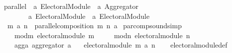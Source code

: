 \begin{isabellebody}
\ parallel\ {\isacharcolon}{\kern0pt}{\isacharcolon}{\kern0pt}\ {\isachardoublequoteopen}{\isacharprime}{\kern0pt}a\ Electoral{\isacharunderscore}{\kern0pt}Module\ {\isasymRightarrow}\ {\isacharprime}{\kern0pt}a\ Aggregator\ {\isasymRightarrow}\isanewline
\ \ \ \ \ \ \ \ {\isacharprime}{\kern0pt}a\ Electoral{\isacharunderscore}{\kern0pt}Module\ {\isasymRightarrow}\ {\isacharprime}{\kern0pt}a\ Electoral{\isacharunderscore}{\kern0pt}Module{\isachardoublequoteclose}\isanewline
\ \ \ \ \ \ {\isacharparenleft}{\kern0pt}{\isachardoublequoteopen}{\isacharunderscore}{\kern0pt}\ {\isasymparallel}\isactrlsub {\isacharunderscore}{\kern0pt}\ {\isacharunderscore}{\kern0pt}{\isachardoublequoteclose}\ {\isacharbrackleft}{\kern0pt}{}{}{\isacharcomma}{\kern0pt}\ {}{}{}{}{\isacharcomma}{\kern0pt}\ {}{}{\isacharbrackright}{\kern0pt}\ {}{}{\isacharparenright}{\kern0pt}\ \isanewline
\ \ {\isachardoublequoteopen}m\ {\isasymparallel}\isactrlsub a\ n\ {\isacharequal}{\kern0pt}{\isacharequal}{\kern0pt}\ parallel{\isacharunderscore}{\kern0pt}composition\ m\ n\ a{\isachardoublequoteclose}%
\isadelimdocument
%
\endisadelimdocument
%
\isatagdocument
%
\isamarkuptrue%
%
\endisatagdocument
{\isafolddocument}%
%
\isadelimdocument
%
\endisadelimdocument
{}\isamarkupfalse%
\ par{\isacharunderscore}{\kern0pt}comp{\isacharunderscore}{\kern0pt}sound{\isacharbrackleft}{\kern0pt}simp{\isacharbrackright}{\kern0pt}{\isacharcolon}{\kern0pt}\isanewline
\ \ \isanewline
\ \ \ \ mod{\isacharunderscore}{\kern0pt}m{\isacharcolon}{\kern0pt}\ {\isachardoublequoteopen}electoral{\isacharunderscore}{\kern0pt}module\ m{\isachardoublequoteclose}\ \isanewline
\ \ \ \ mod{\isacharunderscore}{\kern0pt}n{\isacharcolon}{\kern0pt}\ {\isachardoublequoteopen}electoral{\isacharunderscore}{\kern0pt}module\ n{\isachardoublequoteclose}\ \isanewline
\ \ \ \ agg{\isacharunderscore}{\kern0pt}a{\isacharcolon}{\kern0pt}\ {\isachardoublequoteopen}aggregator\ a{\isachardoublequoteclose}\isanewline
\ \ \ {\isachardoublequoteopen}electoral{\isacharunderscore}{\kern0pt}module\ {\isacharparenleft}{\kern0pt}m\ {\isasymparallel}\isactrlsub a\ n{\isacharparenright}{\kern0pt}{\isachardoublequoteclose}\isanewline
%
\isadelimproof
\ \ %
\endisadelimproof
%
\isatagproof
{}\isamarkupfalse%
\ electoral{\isacharunderscore}{\kern0pt}module{\isacharunderscore}{\kern0pt}def\isanewline

\end{isabellebody}

